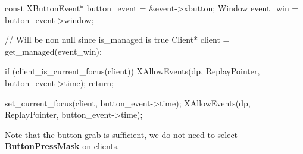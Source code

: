 \documentclass{report}
\begin{document}
\begin{itemize}
\begin{cppcode}
{                    const XButtonEvent* button_event = &event->xbutton;
                    Window event_win = button_event->window;

                    // Will be non null since is_managed is true
                    Client* client = get_managed(event_win);

                    if (client_is_current_focus(client)) {
                        XAllowEvents(dp, ReplayPointer, button_event->time);
                        return;
                    }

                    set_current_focus(client, button_event->time);
                    XAllowEvents(dp, ReplayPointer, button_event->time);
                }
            \end{cppcode}
            \bigbreak \noindent 
            Note that the button grab is sufficient, we do not need to select \textbf{ButtonPressMask} on clients.


    \end{itemize}

    \pagebreak 
\end{document}
